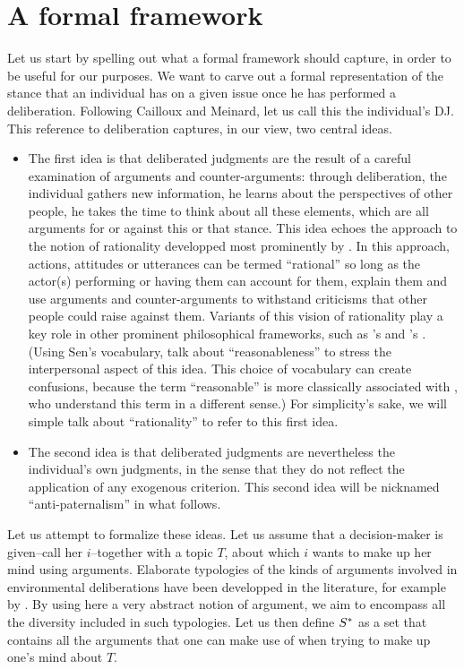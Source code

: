 \documentclass[version=3.21, pagesize, twoside=off, bibliography=totoc, DIV=calc, fontsize=12pt, a4paper, french, english]{scrartcl}
\begin{document}
\section{A formal framework}
Let us start by spelling out what a formal framework should capture, in order to be useful for our purposes. We want to carve out a formal representation of the stance that an individual has on a given issue once he has performed a deliberation. Following Cailloux and Meinard, let us call this the individual's \ac{DJ}. This reference to deliberation captures, in our view, two central ideas.
\begin{itemize}
\item The first idea is that deliberated judgments are the result of a careful examination of arguments and counter-arguments: through deliberation, the individual gathers new information, he learns about the perspectives of other people, he takes the time to think about all these elements, which are all arguments for or against this or that stance. This idea echoes the approach to the notion of rationality developped most prominently by \citet{habermas_theorie_1981}. In this approach, actions, attitudes or utterances can be termed “rational” so long as the actor(s) performing or having them can account for them, explain them and use arguments and counter-arguments to withstand criticisms that other people could raise against them. Variants of this vision of rationality play a key role in other prominent philosophical frameworks, such as \citeauthor{scanlon_what_2000}’s \citeyearpar{scanlon_what_2000} and \citeauthor{sen_idea_2009}’s \citeyearpar{sen_idea_2009}. (Using Sen's vocabulary, \citet{bartkowski_beyond_2018} talk about ``reasonableness'' to stress the interpersonal aspect of this idea. This choice of vocabulary can create confusions, because the term ``reasonable'' is more classically associated with \citet{rawls_political_2005}, who understand this term in a different sense.) For simplicity's sake, we will simple talk about ``rationality'' to refer to this first idea.
\item The second idea is that deliberated judgments are nevertheless the individual's own judgments, in the sense that they do not reflect the application of any exogenous criterion. This second idea will be nicknamed ``anti-paternalism'' in what follows.
\end{itemize}

Let us attempt to formalize these ideas. Let us assume that a decision-maker is given--call her $i$--together with a topic $T$, about which $i$ wants to make up her mind using arguments. Elaborate typologies of the kinds of arguments involved in environmental deliberations have been developped in the literature, for example by \citet{chateauraynaud_contrainte_2007}. By using here a very abstract notion of argument, we aim to encompass all the diversity included in such typologies. Let us then define $S^*$ as a set that contains all the arguments that one can make use of when trying to make up one’s mind about $T$.
\end{document}
